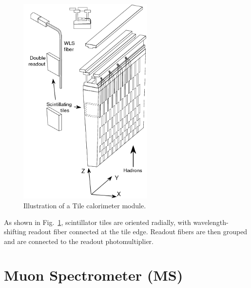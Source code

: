 \begin{figure}[htbp!]
    \centering
    \includegraphics[width=0.6\textwidth]{chapters/c4/figures/tile}
    \caption{Illustration of a Tile calorimeter module.}
    \label{fig:Tile}
\end{figure}

\par As shown in Fig.~\ref{fig:Tile}, scintillator tiles are oriented radially, with wavelength-shifting readout fiber connected at the tile edge. Readout fibers are then grouped and are connected to the readout photomultiplier.

\section{Muon Spectrometer (MS)}
\label{sec:muon}

